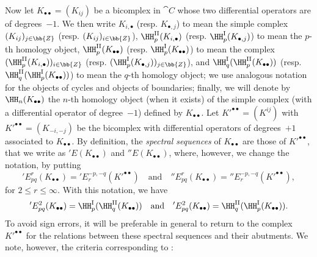 \begin{env}[11.3.5]
\label{0.11.3.5}
Now let $K_{\bullet\bullet} = (K_{ij})$ be a bicomplex in $\cat{C}$ whose two differential operators are of degrees~$-1$.
We then write $K_{i,\bullet}$ (resp. $K_{\bullet,j}$) to mean the simple complex $(K_{ij})_{j\in\bb{Z}}$ (resp. $(K_{ij})_{i\in\bb{Z}}$), $\HH_{p}^\mathrm{II}(K_{i, \bullet})$ (resp. $\HH_{p}^\mathrm{I}(K_{\bullet, j})$) to mean the $p$-th homology object, $\HH_{p}^\mathrm{II}(K_{\bullet\bullet})$ (resp. $\HH_{p}^\mathrm{I}(K_{\bullet\bullet})$) to mean the complex $(\HH_{p}^\mathrm{II}(K_{i, \bullet}))_{i \in\bb{Z}}$ (resp. $(\HH_{p}^\mathrm{I}(K_{\bullet, j}))_{j \in\bb{Z}}$), and $\HH_q^\mathrm{I}(\HH_{p}^\mathrm{II}(K_{\bullet\bullet}))$ (resp. $\HH_q^\mathrm{II}(\HH_{p}^\mathrm{I}(K_{\bullet\bullet}))$) to mean the $q$-th homology object;
we use analogous notation for the objects of cycles and objects of boundaries;
finally, we will denote by $\HH_n(K_{\bullet\bullet})$ the $n$-th homology object (when it exists) of the simple complex (with a differential operator of degree~$-1$) defined by $K_{\bullet\bullet}$.
Let $K'^{\bullet\bullet} = (K^{ij})$ with $K'^{\bullet\bullet} = (K_{-i,-j})$ be the bicomplex with differential operators of degrees~$+1$ associated to $K_{\bullet\bullet}$.
By definition, the \emph{spectral sequences} of $K_{\bullet\bullet}$ are those of $K'^{\bullet\bullet}$, that we write as $'E(K_{\bullet\bullet})$ and $''E(K_{\bullet\bullet})$, where, however, we change the notation, by putting
\[
  'E_{pq}^{r}(K_{\bullet\bullet})
  = 'E_{r}^{-p,-q}(K'^{\bullet\bullet})
  \quad\text{and}\quad
  ''E_{pq}^{r}(K_{\bullet\bullet})
  = ''E_{r}^{-p,-q}(K'^{\bullet\bullet}), 
\]
for $2\leq r \leq \infty$.
With this notation, we have
\[
  'E_{pq}^{2}(K_{\bullet\bullet})
  = \HH_{p}^\mathrm{I}(\HH_{q}^\mathrm{II}(K_{\bullet\bullet}))
  \quad\text{and}\quad
  'E_{pq}^{2}(K_{\bullet\bullet})
  = \HH_{q}^\mathrm{II}(\HH_{p}^\mathrm{I}(K_{\bullet\bullet})).
\]
To avoid sign errors, it will be preferable in general to return to the complex $K'^{\bullet\bullet}$ for the relations between these spectral sequences and their abutments.
We note, however, the criteria corresponding to :
\end{env}

